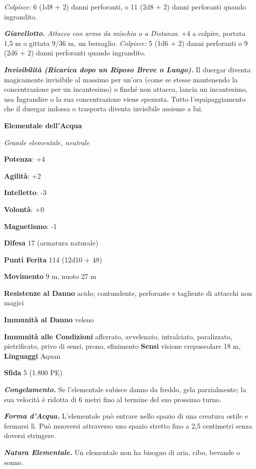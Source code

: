 \begin{multicols}{2}
\emph{Colpisce:} 6 (1d8 + 2) danni perforanti, o 11 (2d8 + 2) danni
perforanti quando ingrandito.

\emph{\textbf{Giavellotto.} Attacco con arma da mischia o a Distanza}:
+4 a colpire, portata 1,5 m o gittata 9/36 m, un bersaglio.
\emph{Colpisce:} 5 (1d6 + 2) danni perforanti o 9 (2d6 + 2) danni
perforanti quando ingrandito.

\emph{\textbf{Invisibilità (Ricarica dopo un Riposo Breve o Lungo).}} Il
duergar diventa magicamente invisibile al massimo per un'ora (come se
stesse mantenendo la concentrazione per un incantesimo) o finché non
attacca, lancia un incantesimo, usa Ingrandire o la sua concentrazione
viene spezzata. Tutto l'equipaggiamento che il duergar indossa o
trasporta diventa invisibile assieme a lui.

\textbf{Elementale dell'Acqua}

\emph{Grande elementale, neutrale}

\textbf{Potenza}: +4

\textbf{Agilità}: +2

\textbf{Intelletto}: -3

\textbf{Volontà}: +0

\textbf{Magnetismo}: -1

\textbf{Difesa} 17 (armatura naturale)

\textbf{Punti Ferita} 114 (12d10 + 48)

\textbf{Movimento} 9 m, nuoto 27 m

\textbf{Resistenze al Danno} acido; contundente, perforante e tagliente
di attacchi non magici

\textbf{Immunità al Danno} veleno

\textbf{Immunità alle Condizioni} afferrato, avvelenato, intralciato,
paralizzato, pietrificato, privo di sensi, prono, sfinimento
\textbf{Sensi} visione crepuscolare 18 m, 
\textbf{Linguaggi} Aquan

\textbf{Sfida} 5 (1.800 PE)

\emph{\textbf{Congelamento.}} Se l'elementale subisce danno da freddo,
gela parzialmente; la sua velocità è ridotta di 6 metri fino al termine
del suo prossimo turno.

\emph{\textbf{Forma d'Acqua.}} L'elementale può entrare nello spazio di
una creatura ostile e fermarsi lì. Può muoversi attraverso uno spazio
stretto fino a 2,5 centimetri senza doversi stringere.

\emph{\textbf{Natura Elementale.}} Un elementale non ha bisogno di aria,
cibo, bevande o sonno.


\end{multicols}
